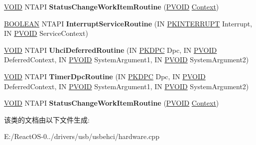 \begin{DoxyCompactItemize}
\item 
\mbox{\label{class_c_u_s_b_hardware_device_a8dddae78d632e9287591b32090d4a0e8}} 
\hyperlink{interfacevoid}{V\+O\+ID} N\+T\+A\+PI {\bfseries Status\+Change\+Work\+Item\+Routine} (\hyperlink{interfacevoid}{P\+V\+O\+ID} \hyperlink{struct_context}{Context})
\item 
\mbox{\label{class_c_u_s_b_hardware_device_a58b9b83976d2aa3f239f6982c5fc3b03}} 
\hyperlink{_processor_bind_8h_a112e3146cb38b6ee95e64d85842e380a}{B\+O\+O\+L\+E\+AN} N\+T\+A\+PI {\bfseries Interrupt\+Service\+Routine} (IN \hyperlink{struct___k_i_n_t_e_r_r_u_p_t}{P\+K\+I\+N\+T\+E\+R\+R\+U\+PT} Interrupt, IN \hyperlink{interfacevoid}{P\+V\+O\+ID} Service\+Context)
\item 
\mbox{\label{class_c_u_s_b_hardware_device_a8fb4f6969fd3e98edff72768ad975b73}} 
\hyperlink{interfacevoid}{V\+O\+ID} N\+T\+A\+PI {\bfseries Uhci\+Deferred\+Routine} (IN \hyperlink{struct___k_d_p_c}{P\+K\+D\+PC} Dpc, IN \hyperlink{interfacevoid}{P\+V\+O\+ID} Deferred\+Context, IN \hyperlink{interfacevoid}{P\+V\+O\+ID} System\+Argument1, IN \hyperlink{interfacevoid}{P\+V\+O\+ID} System\+Argument2)
\item 
\mbox{\label{class_c_u_s_b_hardware_device_a7d01c86bd17243fcf48cbe67c21b7232}} 
\hyperlink{interfacevoid}{V\+O\+ID} N\+T\+A\+PI {\bfseries Timer\+Dpc\+Routine} (IN \hyperlink{struct___k_d_p_c}{P\+K\+D\+PC} Dpc, IN \hyperlink{interfacevoid}{P\+V\+O\+ID} Deferred\+Context, IN \hyperlink{interfacevoid}{P\+V\+O\+ID} System\+Argument1, IN \hyperlink{interfacevoid}{P\+V\+O\+ID} System\+Argument2)
\item 
\mbox{\label{class_c_u_s_b_hardware_device_a8dddae78d632e9287591b32090d4a0e8}} 
\hyperlink{interfacevoid}{V\+O\+ID} N\+T\+A\+PI {\bfseries Status\+Change\+Work\+Item\+Routine} (\hyperlink{interfacevoid}{P\+V\+O\+ID} \hyperlink{struct_context}{Context})
\end{DoxyCompactItemize}


该类的文档由以下文件生成\+:\begin{DoxyCompactItemize}
\item 
E\+:/\+React\+O\+S-\/0../drivers/usb/usbehci/hardware.\+cpp\end{DoxyCompactItemize}
